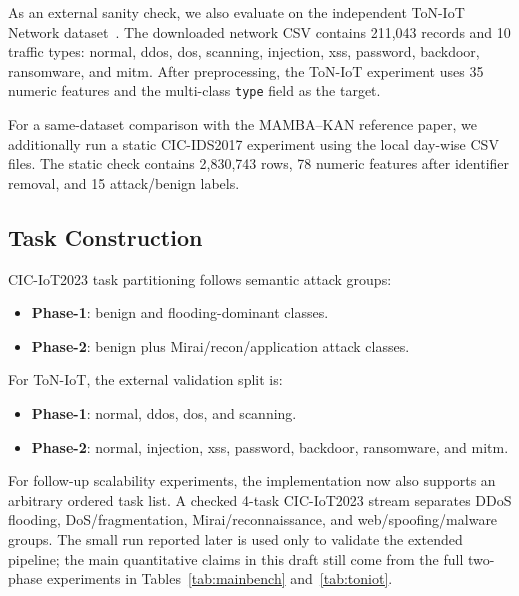 \documentclass[a4paper,fleqn]{cas-dc}
\begin{document}
As an external sanity check, we also evaluate on the independent ToN-IoT Network dataset~\cite{toniot2020}. The downloaded network CSV contains 211,043 records and 10 traffic types: normal, ddos, dos, scanning, injection, xss, password, backdoor, ransomware, and mitm. After preprocessing, the ToN-IoT experiment uses 35 numeric features and the multi-class \texttt{type} field as the target.

For a same-dataset comparison with the MAMBA--KAN reference paper, we additionally run a static CIC-IDS2017 experiment using the local day-wise CSV files. The static check contains 2,830,743 rows, 78 numeric features after identifier removal, and 15 attack/benign labels.

\subsection{Task Construction}
CIC-IoT2023 task partitioning follows semantic attack groups:
\begin{itemize}
\item \textbf{Phase-1}: benign and flooding-dominant classes.
\item \textbf{Phase-2}: benign plus Mirai/recon/application attack classes.
\end{itemize}

For ToN-IoT, the external validation split is:
\begin{itemize}
\item \textbf{Phase-1}: normal, ddos, dos, and scanning.
\item \textbf{Phase-2}: normal, injection, xss, password, backdoor, ransomware, and mitm.
\end{itemize}

For follow-up scalability experiments, the implementation now also supports an arbitrary ordered task list. A checked 4-task CIC-IoT2023 stream separates DDoS flooding, DoS/fragmentation, Mirai/reconnaissance, and web/spoofing/malware groups. The small run reported later is used only to validate the extended pipeline; the main quantitative claims in this draft still come from the full two-phase experiments in Tables~\ref{tab:mainbench} and~\ref{tab:toniot}.
\end{document}
